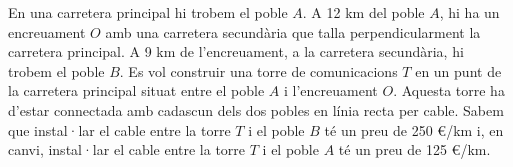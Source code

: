En una carretera principal hi trobem el poble $A$. A 12 km del poble $A$, hi ha un encreuament $O$ amb una carretera
secundària que talla perpendicularment la carretera principal. A 9 km de l'encreuament, a la carretera secundària,
hi trobem el poble $B$. Es vol construir una torre de comunicacions $T$ en un punt de la carretera principal situat
entre el poble $A$ i l'encreuament $O$. Aquesta torre ha d'estar connectada amb cadascun dels dos pobles en línia recta
per cable. Sabem que instal·lar el cable entre la torre $T$ i el poble $B$ té un preu de 250 €/km i, en canvi,
instal·lar el cable entre la torre $T$ i el poble $A$ té un preu de 125 €/km.
\begin{center}
\end{center}


